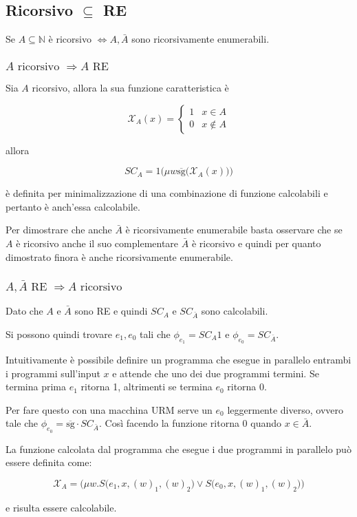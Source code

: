 \subsection{ Ricorsivo $\subseteq $ RE} 

Se $ A \subseteq \mathbb{N} $ è ricorsivo $\Leftrightarrow A, \bar{A}$ sono ricorsivamente enumerabili.

\subsubsection{$A \text{ ricorsivo } \Rightarrow A \text{ RE}$}

Sia $ A $ ricorsivo, allora la sua funzione caratteristica è 

$$
\mathcal{X}_A(x) = \begin{cases}
1 &x \in A \\
0 & x \notin A
\end{cases}
$$

allora 

$$
SC_A = 1\Big( \mu w \overline{\text{sg}}\big( \mathcal{X}_A(x) \big) \Big)
$$

è definita per minimalizzazione di una combinazione di funzione calcolabili e pertanto è anch'essa calcolabile.

Per dimostrare che anche $ \bar{A} $ è ricorsivamente enumerabile basta osservare che se $ A $ è ricorsivo anche il suo complementare $\bar{A} $ è ricorsivo e quindi per quanto dimostrato finora è anche ricorsivamente enumerabile.

\subsubsection{$A, \bar{A} \text{ RE } \Rightarrow A \text{ ricorsivo}$}

Dato che $ A \text{ e } \bar{A} $ sono RE e quindi $ SC_A $ e $ SC_{\bar{A}} $ sono calcolabili.

Si possono quindi trovare $ e_1, e_0 $ tali che $ \phi_{e_1} = SC_A1 $ e $ \phi_{e_0} = SC_{\bar{A}} $.

Intuitivamente è possibile definire un programma che esegue in parallelo entrambi i programmi sull'input $ x $ e attende che uno dei due programmi termini. Se termina prima $ e_1 $ ritorna 1, altrimenti se termina $ e_0 $ ritorna 0.

Per fare questo con una macchina URM serve un $ e_0 $ leggermente diverso, ovvero tale che $ \phi_{e_0} = \overline{\text{sg}} \cdot SC_{\bar{A}} $.
Così facendo la funzione ritorna 0 quando $ x \in \bar{A} $.

La funzione calcolata dal programma che esegue i due programmi in parallelo può essere definita come:

$$
\mathcal{X}_A = \bigg( \mu w. S\Big(e_1, x, (w)_1, (w)_2\Big) \vee S\Big(e_0, x, (w)_1, (w)_2\Big) \bigg)
$$

e risulta essere calcolabile.













